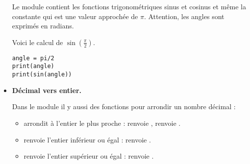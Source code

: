 \documentclass[11pt,class=report,crop=false]{standalone}
\begin{document}
\begin{cours}
\begin{itemize}
  Le module  contient les fonctions trigonométriques sinus et cosinus et même la constante \index{$\pi$} qui est une valeur approchée de $\pi$. Attention, les angles sont exprimés en radians.

Voici le calcul de $\sin(\frac\pi2)$. 
\begin{center}
\begin{minipage}{0.5\textwidth} 
\begin{lstlisting}
angle = pi/2
print(angle)
print(sin(angle))
\end{lstlisting}
\end{minipage}
\end{center}

  \item \textbf{Décimal vers entier.}

Dans le module  il y aussi des fonctions pour arrondir un nombre décimal : 
  \begin{itemize}
    \item {} arrondit à l'entier le plus proche :  renvoie ,  renvoie .
    \item {} renvoie l'entier inférieur ou égal :  renvoie .
    \item {} renvoie l'entier supérieur ou égal :  renvoie .
  \end{itemize}       
    
\end{itemize}

\end{cours}

\end{document}
